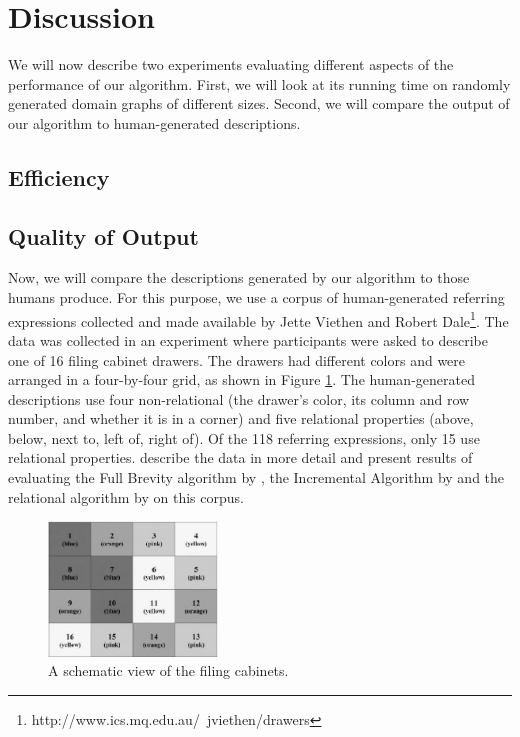 \section{Discussion} \label{sec:discussion}




We will now describe two experiments evaluating different aspects of
the performance of our algorithm. First, we will look at its running
time on randomly generated domain graphs of different sizes. Second,
we will compare the output of our algorithm to human-generated
descriptions.



\subsection{Efficiency}



\subsection{Quality of Output}

Now, we will compare the descriptions generated by our algorithm to
those humans produce. For this purpose, we use a corpus of
human-generated referring expressions collected and made available by
Jette Viethen and Robert
Dale\footnote{http://www.ics.mq.edu.au/~jviethen/drawers}.  The data
was collected in an experiment where participants were asked to
describe one of 16 filing cabinet drawers. The drawers had different
colors and were arranged in a four-by-four grid, as shown in Figure
\ref{fig:drawers}. The human-generated descriptions use four
non-relational (the drawer's \textsf{color}, its \textsf{column} and
\textsf{row} number, and whether it is in a \textsf{corner}) and five
relational properties (\textsf{above, below, next to, left of, right
of}). Of the 118 referring expressions, only 15 use relational properties.
\cite{viethen06:_algor_for_gener_refer_expres}
describe the data in more detail and present results of evaluating the
Full Brevity algorithm by \cite{}, the Incremental Algorithm by
\cite{} and the relational algorithm by \cite{} on this corpus.

\begin{figure}
\includegraphics[width=0.4\textwidth]{drawers.eps}
\caption{A schematic view of the filing cabinets.}\label{fig:drawers}
\end{figure}


